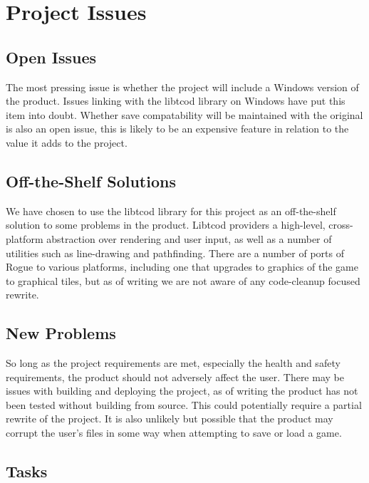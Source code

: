 \documentclass[12pt, titlepage]{article}
\begin{document}
\section{Project Issues}

	\subsection{Open Issues}

		The most pressing issue is whether the project will include a Windows version of the product. Issues linking with the libtcod library on Windows have put this item into doubt. Whether save compatability will be maintained with the original is also an open issue, this is likely to be an expensive feature in relation to the value it adds to the project. 

	\subsection{Off-the-Shelf Solutions}

		We have chosen to use the libtcod library for this project as an off-the-shelf solution to some problems in the product. Libtcod providers a high-level, cross-platform abstraction over rendering and user input, as well as a number of utilities such as line-drawing and pathfinding. There are a number of ports of Rogue to various platforms, including one that upgrades to graphics of the game to graphical tiles, but as of writing we are not aware of any code-cleanup focused rewrite.

	\subsection{New Problems}

		So long as the project requirements are met, especially the health and safety requirements, the product should not adversely affect the user. There may be issues with building and deploying the project, as of writing the product has not been tested without building from source. This could potentially require a partial rewrite of the project. It is also unlikely but possible that the product may corrupt the user's files in some way when attempting to save or load a game.

	\subsection{Tasks}
\end{document}
